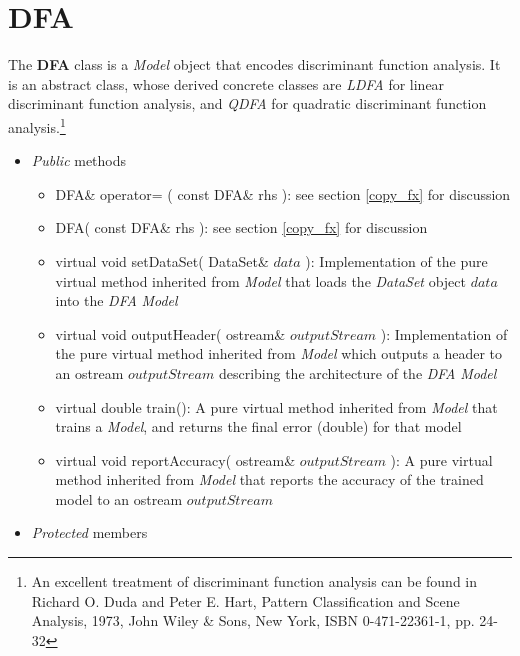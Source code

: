 \documentclass{report}
\def\beginred{\color{red}}
\def\endcolor{\color{black}}
\begin{document}
\section{DFA}

The {\bf DFA} class is a {\em Model} object that encodes discriminant
function analysis.  It is an abstract class, whose derived concrete
classes are {\em LDFA} for linear discriminant function analysis, and
{\em QDFA} for quadratic discriminant function analysis.\footnote{ An
excellent treatment of discriminant function analysis can be found in
Richard O. Duda and Peter E. Hart, Pattern Classification and Scene
Analysis, 1973, John Wiley \& Sons, New York, ISBN 0-471-22361-1,
pp. 24-32}

\begin{itemize}

\item {\em Public} methods

\begin{itemize}
\item DFA\& operator= ( const DFA\& rhs ): see section
      \ref{copy_fx} for discussion
\item DFA( const DFA\& rhs ): see section \ref{copy_fx} for
      discussion
\item virtual void setDataSet( DataSet\& $data$ ): Implementation of
      the pure virtual method inherited from {\em Model} that loads
      the {\em DataSet} object $data$ into the {\em DFA} {\em Model}
\item virtual void outputHeader( ostream\& $outputStream$ ):
      Implementation of the pure virtual method inherited from {\em
      Model} which outputs a header to an ostream $outputStream$
      describing the architecture of the {\em DFA} {\em Model}
\item \beginred virtual double train(): A pure virtual method
      inherited from {\em Model} that trains a {\em Model}, and
      returns the final error (double) for that model \endcolor
\item \beginred virtual void reportAccuracy( ostream\& $outputStream$
      ): A pure virtual method inherited from {\em Model} that reports
      the accuracy of the trained model to an ostream $outputStream$
      \endcolor
\end{itemize}

\item {\em Protected} members


\end{itemize}
\end{document}
